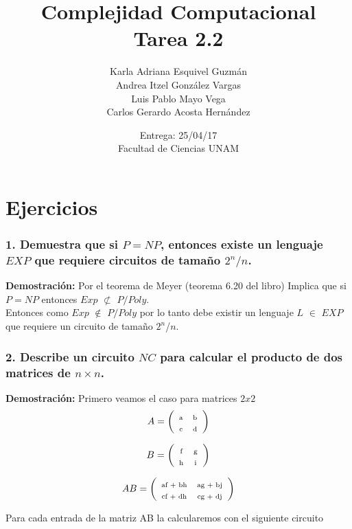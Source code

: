 \documentclass[12pt]{article}
\title{Complejidad Computacional \\ Tarea 2.2}
\author{Karla Adriana Esquivel Guzmán \\ Andrea Itzel González Vargas\\ Luis Pablo Mayo Vega \\ Carlos Gerardo Acosta Hernández}
\date{Entrega: 25/04/17 \\ Facultad de Ciencias UNAM}
\begin{document}
\maketitle
\section*{Ejercicios}
\subsubsection*{1. Demuestra que si $P = NP$, entonces existe un lenguaje $EXP$ que requiere circuitos de tamaño ${2^{n}}/{n}$.} 
\textbf{Demostración:}
Por el teorema de Meyer (teorema 6.20 del libro) Implica que si $P=NP$ entonces $Exp$ $\not \subset$ $P/Poly$.\\
Entonces como $Exp$ $\not\in$ $P/Poly$ por lo tanto debe existir un lenguaje $L$ $\in$ $EXP$ que requiere un circuito de tamaño $2^n$/$n$.
\subsubsection*{2. Describe un circuito $NC$ para calcular el producto de dos matrices de $n \times n$.}
\textbf{Demostración:}
Primero veamos el caso para matrices $2x2$ \\

\[A= \left(
\begin{array}{cc}
\textsubscript{a} & \textsubscript{b}  \\
\textsubscript{c} & \textsubscript{d}  \\
\end{array} 
\right)\]

\[B= \left(
\begin{array}{cc}
\textsubscript{f} & \textsubscript{g}  \\
\textsubscript{h} & \textsubscript{i}  \\
\end{array} 
\right)\]

\[AB= \left(
\begin{array}{cc}
\textsubscript{af + bh} & \textsubscript{ag + bj}  \\
\textsubscript{cf + dh} & \textsubscript{cg + dj}  \\
\end{array} 
\right)\] 

\newpage

Para cada entrada de la matriz AB la calcularemos con el siguiente circuito \\
\end{document}
